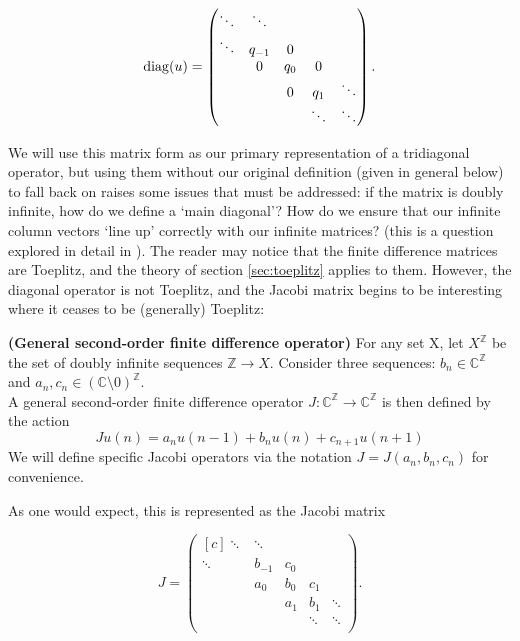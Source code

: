 \documentclass[../main.tex]{subfiles}
\begin{document}
$$
\diag(u) =
\begin{pmatrix*}[c]
\ddots & \ddots & & & \\
\ddots & q_{-1} & 0 & & \\
& 0 & q_0 & 0 & \\
& & 0 & q_1 & \ddots \\
& & & \ddots & \ddots \\
\end{pmatrix*}.
$$

We will use this matrix form as our primary representation of a tridiagonal operator, but using them without our original definition (given in general below) to fall back on raises some issues that must be addressed: if the matrix is doubly infinite, how do we define a `main diagonal'? How do we ensure that our infinite column vectors `line up' correctly with our infinite matrices? (this is a question explored in detail in \cite{lindnerTODO}).
The reader may notice that the finite difference matrices are Toeplitz, and the theory of section \ref{sec:toeplitz} applies to them. However, the diagonal operator is not Toeplitz, and the Jacobi matrix begins to be interesting where it ceases to be (generally) Toeplitz:

\begin{definition}{\textbf{(General second-order finite difference operator)}}
For any set X, let $X^\mathbb{Z}$ be the set of doubly infinite sequences $\mathbb{Z} \rightarrow X$. Consider three sequences: $b_n \in \mathbb{C}^\mathbb{Z}$ and $a_n, c_n \in (\mathbb{C} \setminus 0)^\mathbb{Z}$.\\
A general second-order finite difference operator $J: \mathbb{C}^\mathbb{Z} \rightarrow \mathbb{C}^\mathbb{Z}$ is then defined by the action
\begin{equation}\label{eqn:2efde}
Ju (n) = a_n u(n-1) + b_n u(n) + c_{n+1} u(n+1)
\end{equation}
We will define specific Jacobi operators via the notation $J = J(a_n, b_n, c_n)$ for convenience.
\end{definition}
As one would expect, this is represented as the Jacobi matrix

$$
J =
\begin{pmatrix*}[c]
\ddots & \ddots & & & \\
\ddots & b_{-1} & c_0 & & \\
& a_0 & b_0 & c_1 & \\
& & a_1 & b_1 & \ddots \\
& & & \ddots & \ddots \\
\end{pmatrix*}.
$$
\end{document}
